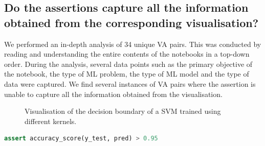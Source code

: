 \documentclass[conference]{IEEEtran}
\begin{document}
\subsection{Do the assertions capture all the information obtained from the corresponding visualisation?}\label{sec:result-rq3}
We performed an in-depth analysis of 34 unique VA pairs. This was conducted by reading and understanding the entire contents of the notebooks in a top-down order. During the analysis, several data points such as the primary objective of the notebook, the type of ML problem, the type of ML model and the type of data were captured. We find several instances of VA pairs where the assertion is unable to capture all the information obtained from the visualisation.

\begin{figure}
  \hfill
  \caption{Visualisation of the decision boundary of a SVM trained using different kernels.}\label{fig:svm}
\end{figure}

\begin{lstlisting}[language=Python, caption={Assertion on the accuracy of the ML model.}, label={lst:svm}]
assert accuracy_score(y_test, pred) > 0.95
\end{lstlisting}
\end{document}
